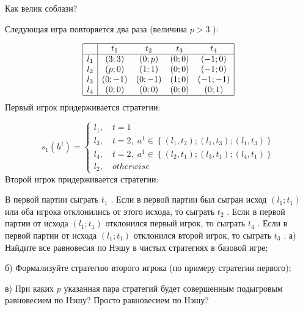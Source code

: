\begin{problem}
 Как велик соблазн?\par
Следующая игра повторяется два раза (величина $p>3$ ):

\[\begin{array}{|c|cccc|}  \hline {} & {t_{1} } & {t_{2} } & {t_{3} } & {t_{4} } \\  \hline {l_{1} } & {\left(3;3\right)} & {\left(0;p\right)} & {\left(0;0\right)} & {\left(-1;0\right)} \\ {l_{2} } & {\left(p;0\right)} & {\left(1;1\right)} & {\left(0;0\right)} & {\left(-1;0\right)} \\ {l_{3} } & {\left(0;-1\right)} & {\left(0;-1\right)} & {\left(1;0\right)} & {\left(-1;-1\right)} \\ {l_{4} } & {\left(0;0\right)} & {\left(0;0\right)} & {\left(0;0\right)} & {\left(0;1\right)} \\  \hline  \end{array}\]
Первый игрок придерживается стратегии:

\[s_{1} \left(h^{t} \right)=\left\{\begin{array}{l} {l_{1} ,\quad t=1} \\ {l_{3} ,\quad t=2,\; a^{1} \in \left\{\left(l_{1} ,t_{2} \right);\left(l_{1} ,t_{3} \right);\left(l_{1} ,t_{3} \right)\right\}} \\ {l_{4} ,\quad t=2,\; a^{1} \in \left\{\left(l_{2} ,t_{1} \right);\left(l_{3} ,t_{1} \right);\left(l_{4} ,t_{1} \right)\right\}} \\ {l_{2} ,\quad otherwise} \end{array}\right. \]
Второй игрок придерживается стратегии:

В первой партии сыграть  $t_{1}$ .
Если в первой партии был сыгран исход  $\left(l_{1} ;t_{1} \right)$  или оба игрока отклонились от этого исхода, то сыграть  $t_{2}$ .
Если в первой партии от исхода  $\left(l_{1} ;t_{1} \right)$  отклонился первый игрок, то сыграть  $t_{4} $ .
Если в первой партии от исхода  $\left(l_{1} ;t_{1} \right)$  отклонился второй игрок, то сыграть  $t_{3} $ .
а) Найдите все равновесия по Нэшу в чистых стратегиях в базовой игре;\par
б) Формализуйте стратегию второго игрока (по примеру стратегии первого);\par
в) При каких  $p$  указанная пара стратегий будет совершенным подыгровым равновесием по Нэшу? Просто равновесием по Нэшу?



\begin{sol}

\end{sol}
\end{problem}



